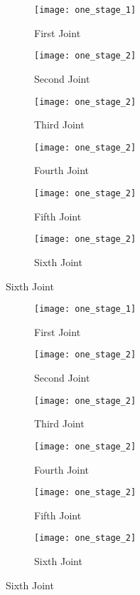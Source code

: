 \begin{figure}[H]
  \caption{Optimization using dynamic friction}
  \begin{subfigure}[t]{0.5\textwidth}
    \centering
    \texttt{[image: one\_stage\_1]} 
    \caption{First Joint}
  \end{subfigure}
  \begin{subfigure}[t]{0.5\textwidth}
    \centering
    \texttt{[image: one\_stage\_2]}
    \caption{Second Joint}
  \end{subfigure}
  \begin{subfigure}[t]{0.5\textwidth}
    \centering
    \texttt{[image: one\_stage\_2]}
    \caption{Third Joint}
  \end{subfigure}
  \begin{subfigure}[t]{0.5\textwidth}
    \centering
    \texttt{[image: one\_stage\_2]}
    \caption{Fourth Joint}
  \end{subfigure}
  \begin{subfigure}[t]{0.5\textwidth}
    \centering
    \texttt{[image: one\_stage\_2]}
    \caption{Fifth Joint}
  \end{subfigure}
  \begin{subfigure}[t]{0.5\textwidth}
    \centering
    \texttt{[image: one\_stage\_2]}
    \caption{Sixth Joint}
  \end{subfigure}
\end{figure}

\begin{figure}[H]
  \caption{ptimization using static friction}
  \begin{subfigure}[t]{0.5\textwidth}
    \centering
    \texttt{[image: one\_stage\_1]} 
    \caption{First Joint}
  \end{subfigure}
  \begin{subfigure}[t]{0.5\textwidth}
    \centering
    \texttt{[image: one\_stage\_2]}
    \caption{Second Joint}
  \end{subfigure}
  \begin{subfigure}[t]{0.5\textwidth}
    \centering
    \texttt{[image: one\_stage\_2]}
    \caption{Third Joint}
  \end{subfigure}
  \begin{subfigure}[t]{0.5\textwidth}
    \centering
    \texttt{[image: one\_stage\_2]}
    \caption{Fourth Joint}
  \end{subfigure}
  \begin{subfigure}[t]{0.5\textwidth}
    \centering
    \texttt{[image: one\_stage\_2]}
    \caption{Fifth Joint}
  \end{subfigure}
  \begin{subfigure}[t]{0.5\textwidth}
    \centering
    \texttt{[image: one\_stage\_2]}
    \caption{Sixth Joint}
  \end{subfigure}
\end{figure}


